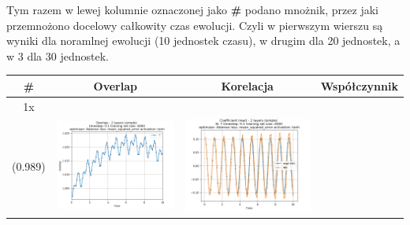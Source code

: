 \documentclass{article}
\begin{document}
Tym razem w lewej kolumnie oznaczonej jako \textbf{\#} podano mnożnik, przez jaki przemnożono docelowy całkowity czas ewolucji. Czyli w pierwszym wierszu są wyniki dla noramlnej ewolucji (10 jednostek czasu), w drugim dla 20 jednostek, a w 3 dla 30 jednostek.

\begin{tabular}{|c|c|c|c|} \hline
     \# & Overlap & Korelacja & Współczynnik  \\ \hline
     1x \\ (0.989) &
     \includegraphics[scale=0.37]{./1,2,3x_longer_than_t_total/2_layers_simple_train_samples=4000_timestep=0.1_t_total=1x_optimizer=Adamax_loss=mean_squared_error_activation=tanh/Overlap.png} &
     \includegraphics[scale=0.37]{./1,2,3x_longer_than_t_total/2_layers_simple_train_samples=4000_timestep=0.1_t_total=1x_optimizer=Adamax_loss=mean_squared_error_activation=tanh/Coeff_N=7_(real).png} &

\end{tabular}
\end{document}
